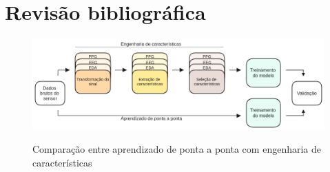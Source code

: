 \chapter{Revisão bibliográfica}

\begin{figure}[!ht]
	\centering
	\caption{Comparação entre aprendizado de ponta a ponta com engenharia de características}
    \includegraphics[scale=0.44]{assets/feature_eng-end_to_end.png}
	\label{fig:feature_eng-end_to_end}
 \tiny
 \sourcemedaddy
\end{figure}

